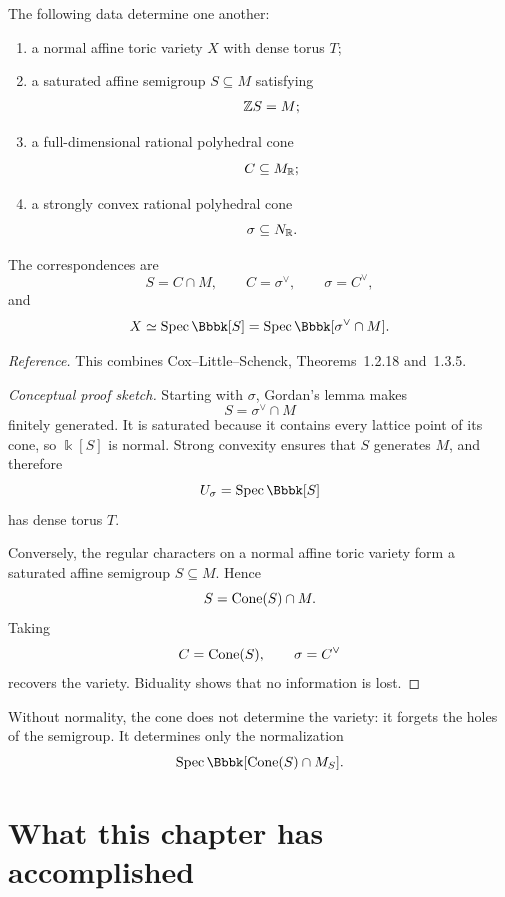 \begin{theorem}
\label{thm:classification-normal-affine-toric-varieties}
The following data determine one another:
\begin{enumerate}[label=(\alph*),wide=0pt]
\item a normal affine toric variety \(X\) with dense torus \(T\);
\item a saturated affine semigroup \(S\subseteq M\) satisfying
\[
\mathbb{Z} S=M;
\]
\item a full-dimensional rational polyhedral cone
\[
C\subseteq M_{\mathbb{R}};
\]
\item a strongly convex rational polyhedral cone
\[
\sigma\subseteq N_{\mathbb{R}}.
\]
\end{enumerate}
The correspondences are
\[
S=C\cap M,
\qquad
C=\sigma^\vee,
\qquad
\sigma=C^\vee,
\]
and
\[
X
\simeq
\Spec\Bbbk[S]
=
\Spec\Bbbk[\sigma^\vee\cap M].
\]
\end{theorem}

\noindent
\textit{Reference.}
This combines Cox--Little--Schenck, Theorems~1.2.18 and~1.3.5.

\begin{proof}[Conceptual proof sketch]
Starting with \(\sigma\), Gordan's lemma makes
\[
S=\sigma^\vee\cap M
\]
finitely generated. It is saturated because it contains every lattice
point of its cone, so \(\Bbbk[S]\) is normal. Strong convexity ensures
that \(S\) generates \(M\), and therefore
\[
U_\sigma=\Spec\Bbbk[S]
\]
has dense torus \(T\).

Conversely, the regular characters on a normal affine toric variety
form a saturated affine semigroup \(S\subseteq M\). Hence
\[
S=\operatorname{Cone}(S)\cap M.
\]
Taking
\[
C=\operatorname{Cone}(S),
\qquad
\sigma=C^\vee
\]
recovers the variety. Biduality shows that no information is lost.
\end{proof}

\begin{warningbox}
Without normality, the cone does not determine the variety: it forgets
the holes of the semigroup. It determines only the normalization
\[
\Spec\Bbbk[\Cone{S}\cap M_S].
\]
\end{warningbox}

\clearpage
\section*{What this chapter has accomplished}

